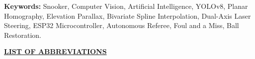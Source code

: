 \vspace{0.4cm}
\noindent \textbf{Keywords:} Snooker, Computer Vision, Artificial Intelligence, YOLOv8, Planar Homography, Elevation Parallax, Bivariate Spline Interpolation, Dual-Axis Laser Steering, ESP32 Microcontroller, Autonomous Referee, Foul and a Miss, Ball Restoration.

\newpage
\tableofcontents

\newpage
{}
\listoftables

\newpage
{}
\listoffigures

\newpage
\thispagestyle{frontmatterstyle}
\begin{center}
    {\Large \textbf{\underline{LIST OF ABBREVIATIONS}}}\\[0.6cm]
\end{center}

